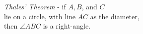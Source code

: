 \documentclass[preview]{standalone}
\begin{document}
\begin{center}
\textit{Thales' Theorem} - if $A,B$, and $C$\\ lie on a circle, with line $\overline{AC}$ as the diameter,\\ then $\angle ABC$ is a right-angle.
\end{center}
\end{document}
